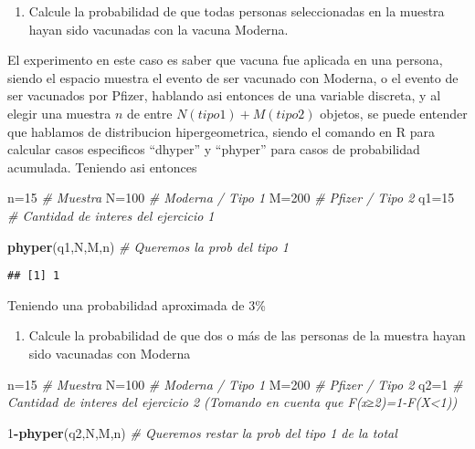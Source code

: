 \documentclass[
]{article}
\newenvironment{Shaded}{\begin{snugshade}}{\end{snugshade}}
\newcommand{\CommentTok}[1]{\textcolor[rgb]{0.56,0.35,0.01}{\textit{#1}}}
\newcommand{\DecValTok}[1]{\textcolor[rgb]{0.00,0.00,0.81}{#1}}
\newcommand{\FunctionTok}[1]{\textcolor[rgb]{0.13,0.29,0.53}{\textbf{#1}}}
\newcommand{\NormalTok}[1]{#1}
\newcommand{\OtherTok}[1]{\textcolor[rgb]{0.56,0.35,0.01}{#1}}
\newcommand{\SpecialCharTok}[1]{\textcolor[rgb]{0.81,0.36,0.00}{\textbf{#1}}}
\providecommand{\tightlist}{%
  \setlength{\itemsep}{0pt}\setlength{\parskip}{0pt}}
\begin{document}
\begin{enumerate}
\def\labelenumi{\arabic{enumi}.}
\tightlist
\item
  Calcule la probabilidad de que todas personas seleccionadas en la
  muestra hayan sido vacunadas con la vacuna Moderna.
\end{enumerate}

El experimento en este caso es saber que vacuna fue aplicada en una
persona, siendo el espacio muestra el evento de ser vacunado con
Moderna, o el evento de ser vacunados por Pfizer, hablando asi entonces
de una variable discreta, y al elegir una muestra \(n\) de entre
\(N(tipo1)+M(tipo2)\) objetos, se puede entender que hablamos de
distribucion hipergeometrica, siendo el comando en R para calcular casos
especificos ``dhyper'' y ``phyper'' para casos de probabilidad
acumulada. Teniendo asi entonces

\begin{Shaded}
\begin{Highlighting}[]
\NormalTok{n}\OtherTok{=}\DecValTok{15} \CommentTok{\# Muestra}
\NormalTok{N}\OtherTok{=}\DecValTok{100} \CommentTok{\# Moderna / Tipo 1}
\NormalTok{M}\OtherTok{=}\DecValTok{200} \CommentTok{\# Pfizer / Tipo 2}
\NormalTok{q1}\OtherTok{=}\DecValTok{15} \CommentTok{\# Cantidad de interes del ejercicio 1}

\FunctionTok{phyper}\NormalTok{(q1,N,M,n) }\CommentTok{\# Queremos la prob del tipo 1}
\end{Highlighting}
\end{Shaded}

\begin{verbatim}
## [1] 1
\end{verbatim}

Teniendo una probabilidad aproximada de 3\%

\begin{enumerate}
\def\labelenumi{\arabic{enumi}.}
\setcounter{enumi}{1}
\tightlist
\item
  Calcule la probabilidad de que dos o más de las personas de la muestra
  hayan sido vacunadas con Moderna
\end{enumerate}

\begin{Shaded}
\begin{Highlighting}[]
\NormalTok{n}\OtherTok{=}\DecValTok{15} \CommentTok{\# Muestra}
\NormalTok{N}\OtherTok{=}\DecValTok{100} \CommentTok{\# Moderna / Tipo 1}
\NormalTok{M}\OtherTok{=}\DecValTok{200} \CommentTok{\# Pfizer / Tipo 2}
\NormalTok{q2}\OtherTok{=}\DecValTok{1} \CommentTok{\# Cantidad de interes del ejercicio 2 (Tomando en cuenta que F(x≥2)=1{-}F(X\textless{}1))}

\DecValTok{1}\SpecialCharTok{{-}}\FunctionTok{phyper}\NormalTok{(q2,N,M,n) }\CommentTok{\# Queremos restar la prob del tipo 1 de la total}
\end{Highlighting}
\end{Shaded}
\end{document}

